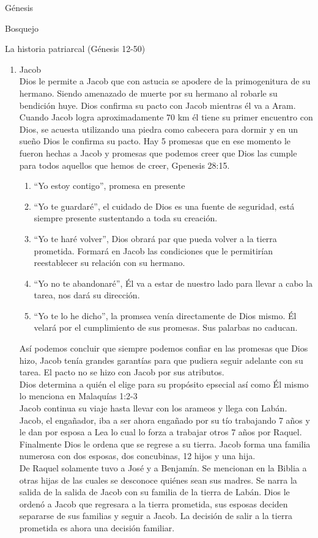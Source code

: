 \begin{section}{Génesis}
\begin{subsection}{Bosquejo}
\begin{subsubsection}{La historia patriarcal (Génesis 12-50)}
\begin{enumerate}
\item Jacob\\
	Dios le permite a Jacob que con astucia se apodere de la primogenitura de su hermano. Siendo amenazado de muerte por su hermano al robarle su bendición huye. Dios confirma su pacto con Jacob mientras él va a Aram. Cuando Jacob logra aproximadamente 70 km él tiene su primer encuentro con Dios, se acuesta utilizando una piedra como cabecera para dormir y en un sueño Dios le confirma su pacto. Hay 5 promesas que en ese momento le fueron hechas a Jacob y promesas que podemos creer que Dios las cumple para todos aquellos que hemos de creer, Gpenesis 28:15. 
	\begin{enumerate}
		\item``Yo estoy contigo'', promesa en presente
		\item ``Yo te guardaré'', el cuidado de Dios es una fuente de seguridad, está siempre presente sustentando a toda su creación.
		\item ``Yo te haré volver'', Dios obrará par que pueda volver a la tierra prometida. Formará en Jacob las condiciones que le permitirían reestablecer su relación con su hermano.
		\item ``Yo no te abandonaré'', Él va a estar de nuestro lado para llevar a cabo la tarea, nos dará su dirección.\newpage
		\item ``Yo te lo he dicho'', la promsea venía directamente de Dios mismo. Él velará por el cumplimiento de sus promesas. Sus palarbas no caducan.
	\end{enumerate}
	Así podemos concluir que siempre podemos confiar en las promesas que Dios hizo, Jacob tenía grandes garantías para que pudiera seguir adelante con su tarea. El pacto no se hizo con Jacob por sus atributos.\\
	Dios determina a quién el elige para su propósito epsecial así como Él mismo lo menciona en Malaquías 1:2-3\\
	Jacob continua su viaje hasta llevar con los arameos y llega con Labán.\\
	Jacob, el engañador, iba a ser ahora engañado por su tío trabajando 7 años y le dan por esposa a Lea lo cual lo forza a trabajar otros 7 años por Raquel.\\
Finalmente Dios le ordena que se regrese a su tierra. Jacob forma una familia numerosa con dos esposas, dos concubinas, 12 hijos y una hija.\\
De Raquel solamente tuvo a José y a Benjamín. Se mencionan en la Biblia a otras hijas de las cuales se desconoce quiénes sean sus madres. Se narra la salida de la salida de Jacob con su familia de la tierra de Labán. Dios le ordenó a Jacob que regresara a la tierra prometida, sus esposas deciden separarse de sus familias y seguir a Jacob. La decisión de salir a la tierra prometida es ahora una decisión familiar.\\

\end{enumerate}
\end{subsubsection}
\end{subsection}
\end{section}
